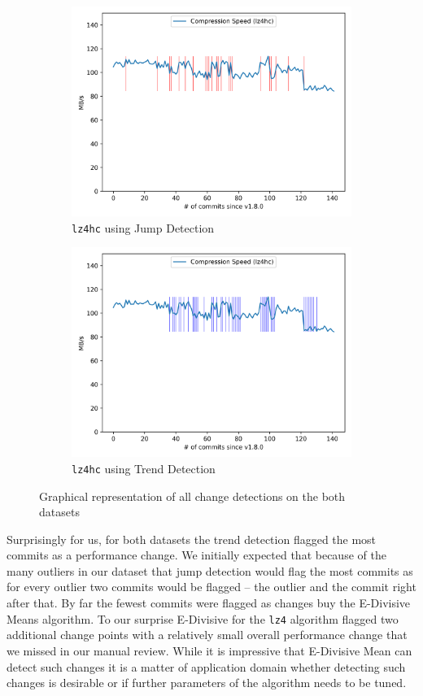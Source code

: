 \documentclass[	runningheads,
				a4paper]{llncs}
\begin{document}
\begin{figure}[ht!]
\begin{subfigure}[b]{0.3\textwidth}
		\includegraphics[width=\textwidth]{graph/lz4hc_commit_jump}
		\caption{\texttt{lz4hc} using Jump Detection}
	\end{subfigure}
	\begin{subfigure}[b]{0.3\textwidth}
		\includegraphics[width=\textwidth]{graph/lz4hc_commit_trend}
		\caption{\texttt{lz4hc} using Trend Detection}
	\end{subfigure}
	\caption{Graphical representation of all change detections on the both datasets}
	\label{fig:}
\end{figure}

Surprisingly for us, for both datasets the trend detection flagged the most commits as a performance change. We initially expected that because of the many outliers in our dataset that jump detection would flag the most commits as for every outlier two commits would be flagged -- the outlier and the commit right after that. By far the fewest commits were flagged as changes buy the E-Divisive Means algorithm. To our surprise E-Divisive for the \texttt{lz4} algorithm flagged two additional change points with a relatively small overall performance change that we missed in our manual review. While it is impressive that E-Divisive Mean can detect such changes it is a matter of application domain whether detecting such changes is desirable or if further parameters of the algorithm needs to be tuned.
\end{document}
